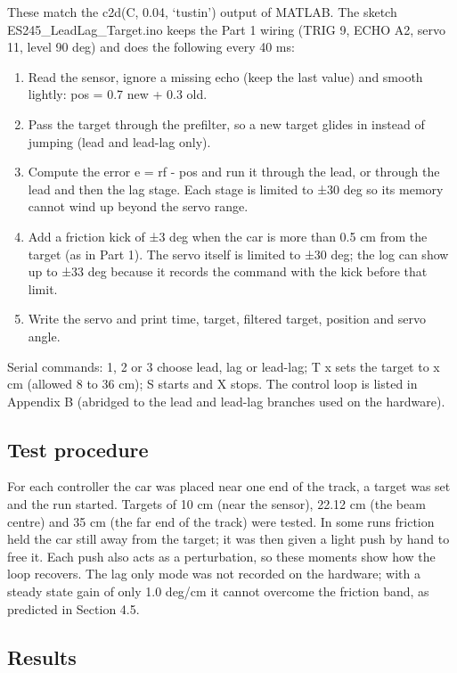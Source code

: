 \documentclass[11pt,a4paper]{article}
\providecommand{\tightlist}{\setlength{\itemsep}{0pt}\setlength{\parskip}{0pt}}
\begin{document}
These match the c2d(C, 0.04, `tustin') output of MATLAB. The sketch
ES245\_LeadLag\_Target.ino keeps the Part 1 wiring (TRIG 9, ECHO A2,
servo 11, level 90 deg) and does the following every 40 ms:

\begin{enumerate}
\def\labelenumi{\arabic{enumi}.}
\tightlist
\item
  Read the sensor, ignore a missing echo (keep the last value) and
  smooth lightly: pos = 0.7 new + 0.3 old.
\item
  Pass the target through the prefilter, so a new target glides in
  instead of jumping (lead and lead-lag only).
\item
  Compute the error e = rf - pos and run it through the lead, or through
  the lead and then the lag stage. Each stage is limited to ±30 deg so
  its memory cannot wind up beyond the servo range.
\item
  Add a friction kick of ±3 deg when the car is more than 0.5 cm from
  the target (as in Part 1). The servo itself is limited to ±30 deg; the
  log can show up to ±33 deg because it records the command with the
  kick before that limit.
\item
  Write the servo and print time, target, filtered target, position and
  servo angle.
\end{enumerate}

Serial commands: 1, 2 or 3 choose lead, lag or lead-lag; T x sets the
target to x cm (allowed 8 to 36 cm); S starts and X stops. The control loop is listed in Appendix B (abridged to the lead and lead-lag branches used on the hardware).

\hypertarget{test-procedure}{%
\subsection{Test procedure}\label{test-procedure}}

For each controller the car was placed near one end of the track, a
target was set and the run started. Targets of 10 cm (near the sensor),
22.12 cm (the beam centre) and 35 cm (the far end of the track) were
tested. In some runs friction held the car still away from the target;
it was then given a light push by hand to free it. Each push also acts
as a perturbation, so these moments show how the loop recovers. The lag
only mode was not recorded on the hardware; with a steady state gain of only 1.0 deg/cm it cannot overcome the friction band, as predicted in Section 4.5.

\hypertarget{results}{%
\subsection{Results}\label{results}}
\end{document}

